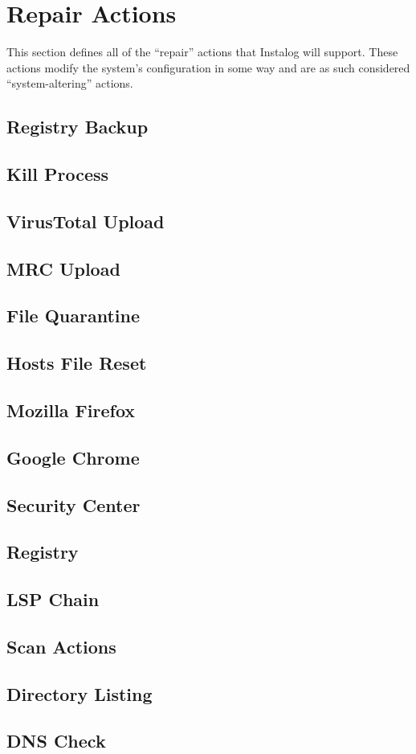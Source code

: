 \section{Repair Actions} \label{sec:repair_actions}
This section defines all of the ``repair'' actions that Instalog will support. 
These actions modify the system's configuration in some way and are as such
considered ``system-altering'' actions. \label{systemaltering}

\subsection{Registry Backup}
\subsection{Kill Process}
\subsection{VirusTotal Upload}
\subsection{MRC Upload}
\subsection{File Quarantine}
\subsection{Hosts File Reset}
\subsection{Mozilla Firefox}
\subsection{Google Chrome}
\subsection{Security Center}
\subsection{Registry}
\subsection{LSP Chain}
\subsection{Scan Actions}
\subsection{Directory Listing}
\subsection{DNS Check}
